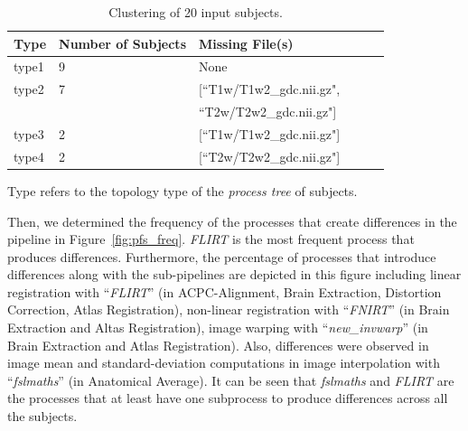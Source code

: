 \documentclass[a4paper,num-refs]{oup-contemporary}
\begin{document}
\begin{table}
\centering
\begin{threeparttable}
\caption{Clustering of 20 input subjects.}

\begin{tabular}{@{}llllll@{}}
\toprule
Type   & Number of Subjects  & Missing File(s)                                    \\ \midrule
type1  & 9                   & None                                               \\
type2  & 7                   & [``T1w/T1w2\_gdc.nii.gz",                          \\
       &                     &  ``T2w/T2w2\_gdc.nii.gz"]                          \\
type3  & 2                   & [``T1w/T1w2\_gdc.nii.gz"]                          \\
type4  & 2                   & [``T2w/T2w2\_gdc.nii.gz"]                          \\ \bottomrule
\end{tabular}
\begin{tablenotes}
     \small
     \item *Type refers to the topology type of the \emph{process tree} of subjects.
\end{tablenotes}
\end{threeparttable}
\label{table:data-clusters}
\end{table}

Then, we determined the frequency of the processes that create differences in 
the pipeline in Figure~\ref{fig:pfs_freq}. \emph{FLIRT} is the most frequent 
process that produces differences.
Furthermore, the percentage of processes that introduce differences 
along with the 
sub-pipelines are depicted in this figure 
including linear registration with “\emph{FLIRT}” (in 
ACPC-Alignment, Brain Extraction, Distortion Correction, 
Atlas Registration), non-linear registration with “\emph{FNIRT}” (in 
Brain Extraction and Altas Registration), image warping with 
“\emph{new\_invwarp}” (in Brain Extraction and Atlas Registration). 
Also, differences were observed in image mean and standard-deviation 
computations in image interpolation with “\emph{fslmaths}” (in Anatomical Average). 
It can be seen that \emph{fslmaths} and \emph{FLIRT} 
are the processes that at least have one subprocess to produce differences across all the subjects.


\end{document}
